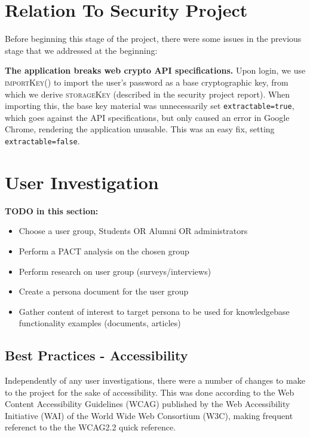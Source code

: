 \documentclass[12pt]{article}
\newcommand{\skey}{\textsc{storageKey} }
\newcommand{\func}[1]{\textsc{#1()}}
\begin{document}
\tableofcontents
\newpage

\section{Relation To Security Project}

Before beginning this stage of the project, there were some issues in the previous stage that we addressed at the beginning:

\textbf{The application breaks web crypto API specifications.} Upon login, we use \func{importKey} to import the user's password as a base cryptographic key, from which we derive \skey (described in the security project report). When importing this, the base key material was unnecessarily set \texttt{extractable=true}, which goes against the API specifications, but only caused an error in Google Chrome, rendering the application unusable. This was an easy fix, setting \texttt{extractable=false}.


\section{User Investigation}

\textbf{TODO in this section:}
\begin{itemize}
    \item Choose a user group, Students OR Alumni OR administrators
    \item Perform a PACT analysis on the chosen group
    \item Perform research on user group (surveys/interviews)
    \item Create a persona document for the user group
    \item Gather content of interest to target persona to be used for knowledgebase functionality examples (documents, articles)
\end{itemize}

\subsection{Best Practices - Accessibility}

Independently of any user investigations, there were a number of changes to make to the project for the sake of accessibility. This was done according to the Web Content Accessibility Guidelines (WCAG) published by the Web Accessibility Initiative (WAI) of the World Wide Web Consortium (W3C), making frequent referenct to the the WCAG2.2 quick reference. \cite{wcag-quickref}
\end{document}
